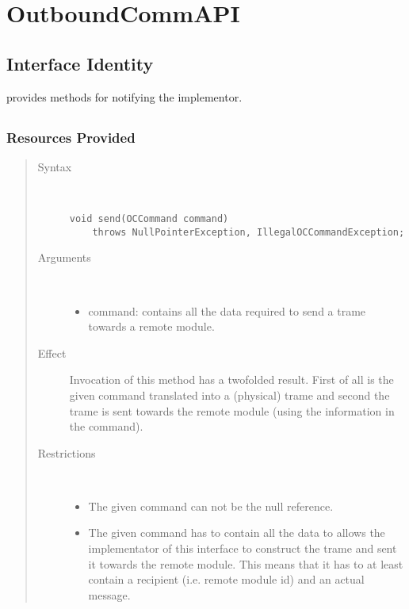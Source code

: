 \section{OutboundCommAPI}
\label{api:rm-outbound-comm-api}

\subsection{Interface Identity}

\npar {} provides methods for notifying the
implementor.

\subsection{}

\subsubsection{Resources Provided}

\begin{quote}
	\begin{description}
		\item[Syntax] \
		\begin{verbatim}
void send(OCCommand command)
    throws NullPointerException, IllegalOCCommandException;
		\end{verbatim}
		\item[Arguments] \
		\begin{itemize}
		  \item command: contains all the data required to send a trame towards a
		  remote module.
		\end{itemize}
		\item[Effect] Invocation of this method has a twofolded result. First of
		all is the given command translated into a (physical) trame and second the
		trame is sent towards the remote module (using the information in the
		command).
		\item[Restrictions] \
		\begin{itemize}
		  \item The given command can not be the null reference.
		  \item The given command has to contain all the data to allows the
		  implementator of this interface to construct the trame and sent it towards
		  the remote module. This means that it has to at least contain a recipient
		  (i.e. remote module id) and an actual message.
		\end{itemize}
	\end{description} 
\end{quote}

